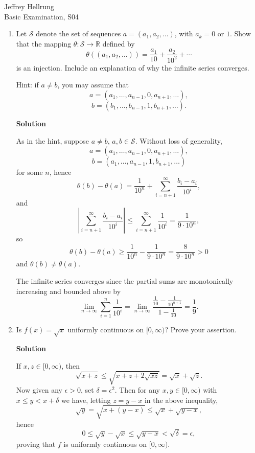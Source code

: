 \documentclass{article}
\begin{document}
\begin{flushright}
Jeffrey Hellrung \\
Basic Examination, S04 \\
\end{flushright}


\begin{enumerate}

\item Let \(\mathcal{S}\) denote the set of sequences \(a = (a_1, a_2, \ldots)\), with \(a_k = 0\) or \(1\).  Show that the mapping \(\theta : \mathcal{S} \to \mathbb{R}\) defined by
\[\theta((a_1, a_2, \ldots)) = \frac{a_1}{10} + \frac{a_2}{10^2} + \cdots\]
is an injection.  Include an explanation of why the infinite series converges.

Hint:  if \(a \neq b\), you may assume that
\[a = (a_1, \ldots, a_{n - 1}, 0, a_{n + 1}, \ldots),\]
\[b = (b_1, \ldots, b_{n - 1}, 1, b_{n + 1}, \ldots).\]

{\bf Solution}

As in the hint, suppose \(a \neq b\), \(a,b \in \mathcal{S}\).  Without loss of generality,
\[a = (a_1, \ldots, a_{n - 1}, 0, a_{n + 1}, \ldots),\]
\[b = (a_1, \ldots, a_{n - 1}, 1, b_{n + 1}, \ldots)\]
for some \(n\), hence
\[\theta(b) - \theta(a)
  = \frac{1}{10^n} + \sum_{i = n + 1}^{\infty} \frac{b_i - a_i}{10^i},\]
and
\[\left| \sum_{i = n + 1}^{\infty} \frac{b_i - a_i}{10^i} \right|
    \leq \sum_{i = n + 1}^{\infty} \frac{1}{10^i}
       = \frac{1}{9 \cdot 10^n},\]
so
\[\theta(b) - \theta(a) \geq \frac{1}{10^n} - \frac{1}{9 \cdot 10^n} = \frac{8}{9 \cdot 10^n} > 0\]
and \(\theta(b) \neq \theta(a)\).

The infinite series converges since the partial sums are monotonically increasing and bounded above by
\[\lim_{n \to \infty} \sum_{i = 1}^n \frac{1}{10^i}
  = \lim_{n \to \infty} \frac{\frac{1}{10} - \frac{1}{10^{n + 1}}}{1 - \frac{1}{10}}
  = \frac{1}{9}.\]



\item Is \(f(x) = \sqrt{x}\) uniformly continuous on \([0,\infty)\)?  Prove your assertion.

{\bf Solution}

If \(x,z \in [0,\infty)\), then
\[\sqrt{x + z} \leq \sqrt{x + z + 2\sqrt{xz}} = \sqrt{x} + \sqrt{z}.\]
Now given any \(\epsilon > 0\), set \(\delta = \epsilon^2\).  Then for any \(x,y \in [0,\infty)\) with \(x \leq y < x + \delta\) we have, letting \(z = y - x\) in the above inequality,
\[\sqrt{y} = \sqrt{x + (y - x)} \leq \sqrt{x} + \sqrt{y - x},\]
hence
\[0 \leq \sqrt{y} - \sqrt{x} \leq \sqrt{y - x} < \sqrt{\delta} = \epsilon,\]
proving that \(f\) is uniformly continuous on \([0,\infty)\).




\end{enumerate}
\end{document}
